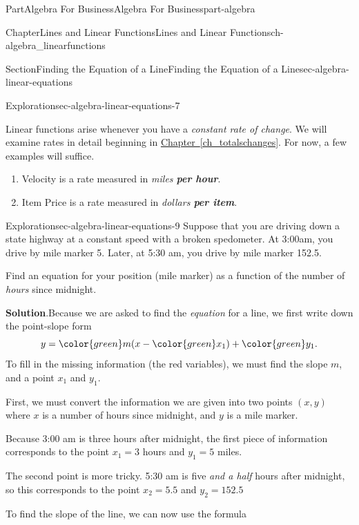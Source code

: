 \documentclass[oneside,10pt,]{tufte-book}
\newcommand{\blocktitlefont}{\relax}
\newcommand{\xreffont}{\relax}
\newcommand{\alert}[1]{\textbf{\textit{#1}}}
\numberwithin{equation}{chapter}
\begin{document}
\begin{partptx}{Part}{Algebra For Business}{}{Algebra For Business}{}{}{part-algebra}
\begin{chapterptx}{Chapter}{Lines and Linear Functions}{}{Lines and Linear Functions}{}{}{ch-algebra_linearfunctions}
\begin{sectionptx}{Section}{Finding the Equation of a Line}{}{Finding the Equation of a Line}{}{}{sec-algebra-linear-equations}
\begin{exploration}{Exploration}{}{sec-algebra-linear-equations-7}
\begin{image}{0.25}{0.5}{0.25}{}
{
}%
\end{image}%
\end{exploration}%
Linear functions arise whenever you have a \emph{constant rate of change}. We will examine rates in detail beginning in \hyperref[ch_totalschanges]{Chapter~{\xreffont\ref{ch_totalschanges}}}. For now, a few examples will suffice.%
\begin{enumerate}
\item{}Velocity is a rate measured in \emph{miles \alert{per hour}}.%
\item{}Item Price is a rate measured in \emph{dollars \alert{per item}}.%
\end{enumerate}
%
\begin{exploration}{Exploration}{}{sec-algebra-linear-equations-9}%
Suppose that you are driving down a state highway at a constant speed with a broken spedometer. At 3:00am, you drive by mile marker 5. Later, at 5:30 am, you drive by mile marker 152.5.%
\par
Find an equation for your position (mile marker) as a function of the number of \emph{hours} since midnight.%
\par\smallskip%
\noindent\textbf{\blocktitlefont Solution}.\hypertarget{sec-algebra-linear-equations-9-2}{}\quad{}Because we are asked to find the \emph{equation} for a line, we first write down the point-slope form%
\begin{equation*}
y = {\color{green} m} (x - { \color{green} x_1}) + {\color{green} y_1} \text{.}
\end{equation*}
To fill in the missing information (the red variables), we must find the slope \(m\), and a point \(x_1\) and \(y_1\).%
\par
First, we must convert the information we are given into two points \((x,y)\) where \(x\) is a number of hours since midnight, and \(y\) is a mile marker.%
\par
Because 3:00 am is three hours after midnight, the first piece of information corresponds to the point \(x_1 = 3\) hours and \(y_1=5\) miles.%
\par
The second point is more tricky.  5:30 am is five \emph{and a half} hours after midnight, so this corresponds to the point \(x_2=5.5\) and \(y_2 = 152.5\)%
\par
To find the slope of the line, we can now use the formula%

\end{exploration}
\end{sectionptx}
\end{chapterptx}
\end{partptx}
\end{document}
